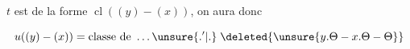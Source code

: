 
$t$ est de la forme $\operatorname{cl}((y)-(x))$, on aura donc

\[
u((y)-(x))=\text{classe de }\ldots\unsure{.'|.}\;\deleted{\unsure{y.\Theta-x.\Theta-\Theta}}
\]

